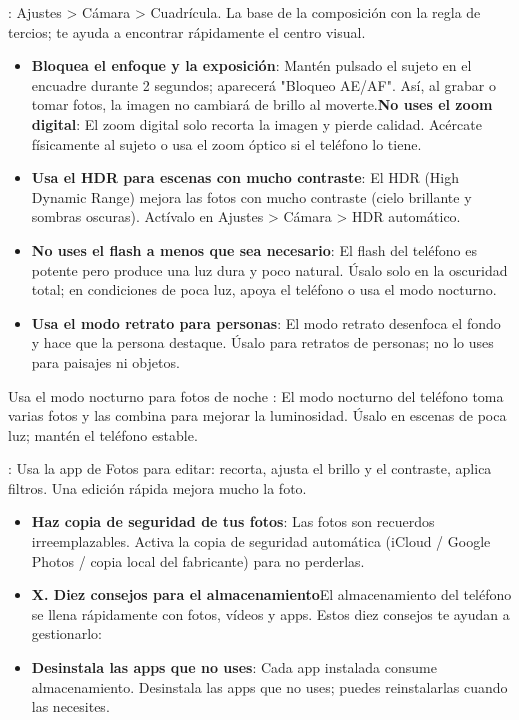 


: Ajustes > Cámara > Cuadrícula. La base de la composición con la regla de tercios; te ayuda a encontrar rápidamente el centro visual.

\begin{itemize}
  \item \textbf{Bloquea el enfoque y la exposición}: Mantén pulsado el sujeto en el encuadre durante 2 segundos; aparecerá "Bloqueo AE/AF". Así, al grabar o tomar fotos, la imagen no cambiará de brillo al moverte.\textbf{No uses el zoom digital}: El zoom digital solo recorta la imagen y pierde calidad. Acércate físicamente al sujeto o usa el zoom óptico si el teléfono lo tiene.
  \item \textbf{Usa el HDR para escenas con mucho contraste}: El HDR (High Dynamic Range) mejora las fotos con mucho contraste (cielo brillante y sombras oscuras). Actívalo en Ajustes > Cámara > HDR automático.
  \item \textbf{No uses el flash a menos que sea necesario}: El flash del teléfono es potente pero produce una luz dura y poco natural. Úsalo solo en la oscuridad total; en condiciones de poca luz, apoya el teléfono o usa el modo nocturno.
  \item \textbf{Usa el modo retrato para personas}: El modo retrato desenfoca el fondo y hace que la persona destaque. Úsalo para retratos de personas; no lo uses para paisajes ni objetos.
\end{itemize}

\begin{tcbinfo}{Usa el modo nocturno para fotos de noche}
: El modo nocturno del teléfono toma varias fotos y las combina para mejorar la luminosidad. Úsalo en escenas de poca luz; mantén el teléfono estable.

\end{tcbinfo}


: Usa la app de Fotos para editar: recorta, ajusta el brillo y el contraste, aplica filtros. Una edición rápida mejora mucho la foto.

\begin{itemize}
  \item \textbf{Haz copia de seguridad de tus fotos}: Las fotos son recuerdos irreemplazables. Activa la copia de seguridad automática (iCloud / Google Photos / copia local del fabricante) para no perderlas.
  \item \textbf{X. Diez consejos para el almacenamiento}El almacenamiento del teléfono se llena rápidamente con fotos, vídeos y apps. Estos diez consejos te ayudan a gestionarlo:
  \item \textbf{Desinstala las apps que no uses}: Cada app instalada consume almacenamiento. Desinstala las apps que no uses; puedes reinstalarlas cuando las necesites.
\end{itemize}

